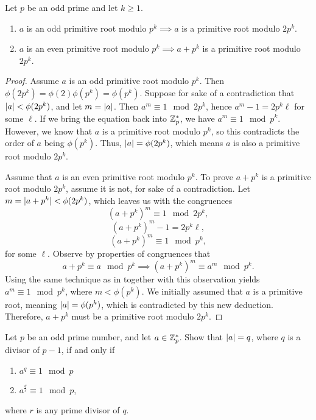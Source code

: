 \documentclass[11pt]{article}
\begin{document}
\begin{exercise}{4}
Let $ p $ be an odd prime and let $ k \geq 1 $.
\begin{enumerate}
	\item $ a $ is an odd primitive root modulo $ p^{k} \implies a $ is a primitive root modulo $ 2p^{k} $.
	\item $ a $ is an even primitive root modulo $ p^{k} \implies a + p^{k}$ is a primitive root modulo $ 2p^{k} $.
\end{enumerate}
\end{exercise}

\begin{proof}
 Assume $ a $ is an odd primitive root modulo $ p^{k} $. Then $ \phi(2p^{k})  = \phi(2) \phi(p^{k}) = \phi(p^{k})$. Suppose for sake of a contradiction that $ |a| < \phi(2 p^{k})$, and let $ m = |a| $. Then $ a^{m} \equiv 1 \mod 2 p^{k} $, hence 
$ a^{m} - 1 = 2 p^{k} \ell $ for some $ \ell $. If we bring the equation back into $ \mathbb{Z}^{*}_{p} $, we have $ a^{m} \equiv 1 \mod p^{k} $. However, we know that $ a $ is a primitive root modulo $ p^{k} $, so this contradicts the order of $ a $ being $ \phi(p^{k}) $. Thus, $ |a| = \phi(2p^{k}) $, which means $ a $ is also a primitive root modulo $ 2p^{k} $.

 Assume that $ a $ is an even primitive root modulo $ p^{k} $. To prove $ a + p^{k}$ is a primitive root modulo $ 2p^{k} $, assume it is not, for sake of a contradiction. Let $m =  |a + p^{k}| < \phi(2p^{k}) $, which leaves us with the congruences
\[ (a +p^{k})^{m} \equiv 1 \mod 2 p^{k}, \]
\[ (a + p^{k})^{m} - 1 = 2 p^{k} \ell, \]
\[ (a + p^{k})^{m} \equiv 1 \mod p^{k}, \]
for some $ \ell $. Observe by properties of congruences that
\[ a + p^{k} \equiv a \mod p^{k} \implies (a + p^{k})^{m} \equiv a^{m} \mod p^{k}. \]
Using the same technique as in  together with this observation yields $ a^{m} \equiv 1 \mod p^{k} $, where $ m < \phi(p^{k}) $. We initially assumed that $ a $ is a primitive root, meaning $ |a| = \phi(p^{k}) $, which is contradicted by this new deduction. Therefore, $ a + p^{k} $ must be a primitive root modulo $ 2p^{k} $.
\end{proof}

\begin{exercise}{5}
Let $ p $ be an odd prime number, and let $ a \in \mathbb{Z}_{p}^{*} $. Show that $ |a|  = q	 $, where $ q $ is a divisor of $ p-1 $, if and only if
\begin{enumerate}
	\item $ a^{q} \equiv 1 \mod p $
	\item $ a^{\frac{q}{r}} \equiv 1 \mod p$,
\end{enumerate}
where $ r $ is any prime divisor of $ q $.
\end{exercise}
\end{document}
